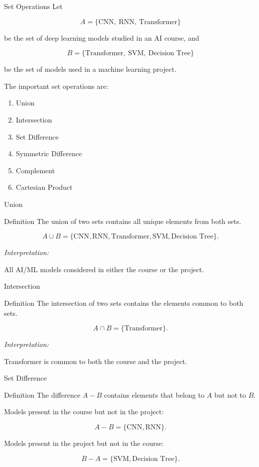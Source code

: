 \documentclass[aspectratio=169]{beamer}
\begin{document}
\begin{frame}{Set Operations}
Let

\[
A=\{\text{CNN},\ \text{RNN},\ \text{Transformer}\}
\]

be the set of deep learning models studied in an AI course, and

\[
B=\{\text{Transformer},\ \text{SVM},\ \text{Decision Tree}\}
\]

be the set of models used in a machine learning project.

The important set operations are:

\begin{enumerate}
\item Union
\item Intersection
\item Set Difference
\item Symmetric Difference
\item Complement
\item Cartesian Product
\end{enumerate}
\end{frame}

\begin{frame}{Union}
\begin{block}{Definition}
The union of two sets contains all unique elements from both sets.
\end{block}

\[
A\cup B=
\{\text{CNN},
\text{RNN},
\text{Transformer},
\text{SVM},
\text{Decision Tree}\}.
\]

\textit{Interpretation:}

All AI/ML models considered in either the course or the project.
\end{frame}

\begin{frame}{Intersection}
\begin{block}{Definition}
The intersection of two sets contains the elements common to both sets.
\end{block}

\[
A\cap B=
\{\text{Transformer}\}.
\]

\textit{Interpretation:}

Transformer is common to both the course and the project.
\end{frame}

\begin{frame}{Set Difference}
\begin{block}{Definition}
The difference $A-B$ contains elements that belong to $A$ but not to $B$.
\end{block}

Models present in the course but not in the project:

\[
A-B=
\{\text{CNN},\text{RNN}\}.
\]

Models present in the project but not in the course:

\[
B-A=
\{\text{SVM},\text{Decision Tree}\}.
\]
\end{frame}
\end{document}
